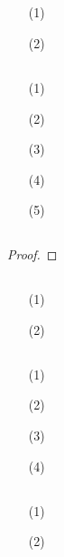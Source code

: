 \documentclass[UTF8]{ctexart}
\begin{document}
\subsection{}   %
\begin{enumerate}
    \item [(1)]
    \item [(2)]
\end{enumerate}

\subsection{}   %
\begin{enumerate}
    \item [(1)]
    \item [(2)]
    \item [(3)]
    \item [(4)]
    \item [(5)]
\end{enumerate}

\subsection{}   %
\begin{proof}
    
\end{proof}

\subsection{}   %
\begin{enumerate}
    \item [(1)]
    \item [(2)]
\end{enumerate}

\subsection{}   %
\begin{enumerate}
    \item [(1)]
    \item [(2)]
    \item [(3)]
    \item [(4)]
\end{enumerate}

\subsection{}   %
\begin{enumerate}
    \item [(1)]
    \item [(2)]
\end{enumerate}
\end{document}
